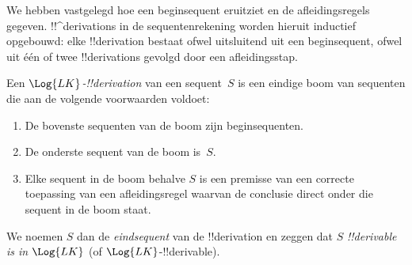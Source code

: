 \documentclass[../../../include/open-logic-section]{subfiles}
\begin{document}
      {}
      {}


\begin{explain}
We hebben vastgelegd hoe een beginsequent eruitziet en de
afleidingsregels gegeven. !!^{derivation}s in de sequentenrekening
worden hieruit inductief opgebouwd: elke !!{derivation} bestaat ofwel
uitsluitend uit een beginsequent, ofwel uit één of twee
!!{derivation}s gevolgd door een afleidingsstap.
\end{explain}

\begin{defn}
Een \emph{$\Log{LK}$-!!{derivation}} van een sequent~$S$ is een eindige
boom van sequenten die aan de volgende voorwaarden voldoet:
\begin{enumerate}
\item De bovenste sequenten van de boom zijn beginsequenten.
\item De onderste sequent van de boom is~$S$.
\item Elke sequent in de boom behalve $S$ is een premisse van een
  correcte toepassing van een afleidingsregel waarvan de conclusie
  direct onder die sequent in de boom staat.
\end{enumerate}
We noemen $S$ dan de \emph{eindsequent} van de !!{derivation} en zeggen
dat $S$ \emph{!!{derivable} is in $\Log{LK}$} (of
$\Log{LK}$-!!{derivable}).
\end{defn}
\end{document}
